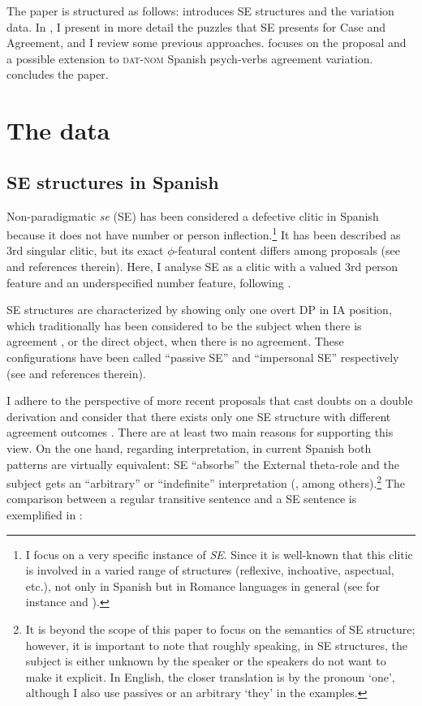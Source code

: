 \documentclass[output=paper,colorlinks,citecolor=brown]{langscibook}
\begin{document}
The paper is structured as follows:  introduces SE structures and the variation data. In , I present in more detail the puzzles that SE presents for Case and Agreement, and I review some previous approaches.  focuses on the proposal and a possible extension to \textsc{dat-nom} Spanish psych-verbs agreement variation.  concludes the paper.

\section{The data}\label{05:sec:fernandez:2}

\subsection{SE structures in Spanish}

Non-paradigmatic \textit{se} (SE) has been considered a defective clitic in Spanish because it does not have number or person inflection.\footnote{I focus on a very specific instance of \textit{SE}. Since it is well-known that this clitic is involved in a varied range of structures (reflexive, inchoative, aspectual, etc.), not only in Spanish but in Romance languages in general (see for instance \citealt{Mendikoetxea2012} and \citealt{MacDonald2017}).} It has been described as 3rd singular clitic, but its exact $\phi$-featural content differs among proposals (see \citealt{Torrego2008} and references therein). Here, I analyse SE as a clitic with a valued 3rd person feature and an underspecified number feature, following \citet{DAlessandro2007}.

SE structures are characterized by showing only one overt DP in IA position, which traditionally has been considered to be the subject when there is agreement , or the direct object, when there is no agreement. These configurations have been called ``passive SE'' and ``impersonal SE'' respectively (see \citealt{Mendikoetxea1999, SanchezLopez2002} and references therein).

I adhere to the perspective of more recent proposals that cast doubts on a double derivation and consider that there exists only one SE structure with different agreement outcomes \citep{PujalteSaab2014, OrmazabalRomero2019, Gallego2016, Gallego2019}. There are at least two main reasons for supporting this view. On the one hand, regarding interpretation, in current Spanish both patterns are virtually equivalent: SE ``absorbs'' the External theta-role \citep{Cinque1988d}
and the subject gets an ``arbitrary'' or ``indefinite'' interpretation (\citealt{RaposoUriag1996}, among others).\footnote{It is beyond the scope of this paper to focus on the semantics of SE structure; however, it is important to note that roughly speaking, in SE structures, the subject is either unknown by the speaker or the speakers do not want to make it explicit. In English, the closer translation is by the pronoun `one', although I also use passives or an arbitrary `they' in the examples.} The comparison between a regular transitive sentence and a SE sentence is exemplified in :
\end{document}
